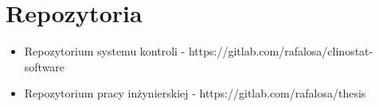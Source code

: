 \chapter*{Repozytoria}

\begin{itemize}
	\item Repozytorium systemu kontroli - https://gitlab.com/rafalosa/clinostat-software
	\item Repozytorium pracy inżynierskiej - https://gitlab.com/rafalosa/thesis
\end{itemize}\textbf{}